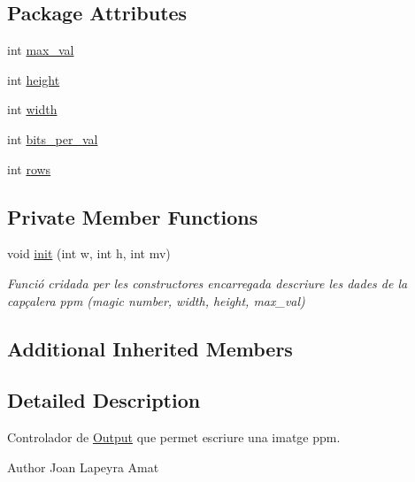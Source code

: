 \subsection*{Package Attributes}
\begin{DoxyCompactItemize}
\item 
int \hyperlink{classpersistencia_1_1output_1_1Ctrl__Output__Img_ab9e685dae026afe43188c62d7c4fad53}{max\+\_\+val}
\item 
int \hyperlink{classpersistencia_1_1output_1_1Ctrl__Output__Img_a1d7bc52c64c79e8545ae6d1ae8b9ee2e}{height}
\item 
int \hyperlink{classpersistencia_1_1output_1_1Ctrl__Output__Img_ae4a01ec459078cece4815d2fe7db8a64}{width}
\item 
int \hyperlink{classpersistencia_1_1output_1_1Ctrl__Output__Img_ad40e63d16abd9058889249f5ad84f200}{bits\+\_\+per\+\_\+val}
\item 
int \hyperlink{classpersistencia_1_1output_1_1Ctrl__Output__Img_a586ee8128a26b6786471e040a705bdbc}{rows}
\end{DoxyCompactItemize}
\subsection*{Private Member Functions}
\begin{DoxyCompactItemize}
\item 
void \hyperlink{classpersistencia_1_1output_1_1Ctrl__Output__Img_aab3258280bd6abb81d580c93eb68fb28}{init} (int w, int h, int mv)
\begin{DoxyCompactList}\small\item\em Funció cridada per les constructores encarregada d\textquotesingle{}escriure les dades de la capçalera ppm (magic number, width, height, max\+\_\+val) \end{DoxyCompactList}\end{DoxyCompactItemize}
\subsection*{Additional Inherited Members}


\subsection{Detailed Description}
Controlador de \hyperlink{classpersistencia_1_1output_1_1Output}{Output} que permet escriure una imatge ppm. 

\begin{DoxyAuthor}{Author}
Joan Lapeyra Amat 
\end{DoxyAuthor}


